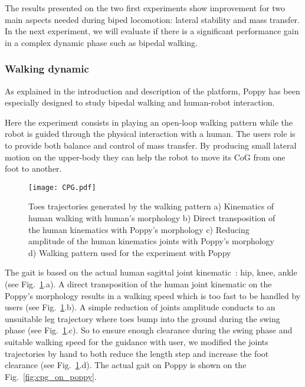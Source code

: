 The results presented on the two first experiments show improvement for two main aspects needed during biped locomotion: lateral stability and mass transfer. In the next experiment, we will evaluate if there is a significant performance gain in a complex dynamic phase such as bipedal walking.



\subsubsection{Walking dynamic} %
\label{sub:walking_dynamic}

As explained in the introduction and description of the platform, Poppy has been especially designed to study bipedal walking and human-robot interaction.

Here the experiment consists in playing an open-loop walking pattern while the robot is guided through the physical interaction with a human. The users role is to provide both balance and control of mass transfer. By producing small lateral motion on the upper-body they can help the robot to move its CoG from one foot to another.

\begin{figure}[h]
    \centering
    \texttt{[image: CPG.pdf]}
    \caption{Toes trajectories generated by the walking pattern a) Kinematics of human walking
    with human's morphology b) Direct transposition of the human kinematics with Poppy's morphology
    c) Reducing amplitude of the human kinematics joints with Poppy's morphology d) Walking pattern
    used for the experiment with Poppy}
    \label{fig:CPG}
\end{figure}

The gait is based on the actual human sagittal joint kinematic~\cite{Nester2003}: hip, knee, ankle (see Fig.~\ref{fig:CPG}.a). A direct transposition of the human joint kinematic on the Poppy's morphology results in a walking speed which is too fast to be handled by users (see Fig.~\ref{fig:CPG}.b). A simple reduction of joints amplitude conducts to an unsuitable leg trajectory where toes bump into the ground during the swing phase (see Fig.~\ref{fig:CPG}.c). So to ensure enough clearance during the swing phase and suitable walking speed for the guidance with user, we modified the joints trajectories by hand to both reduce the length step and increase the foot clearance (see Fig.~\ref{fig:CPG}.d). The actual gait on Poppy is shown on the Fig.~\ref{fig:cpg_on_poppy}.


